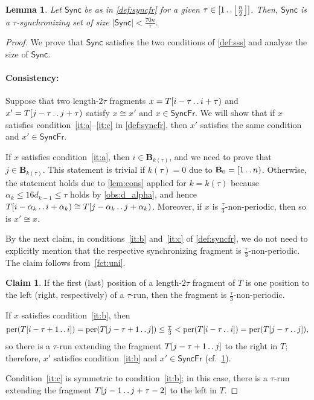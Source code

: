 \documentclass[a4paper]{article}
\newtheorem{lemma}[theorem]{Lemma}
\theoremstyle{definition}
\newtheorem{claim}[theorem]{Claim}
\theoremstyle{remark}
\newcommand{\B}{\mathbf{B}}
\newcommand{\floor}[1]{\left\lfloor #1 \right\rfloor}
\newcommand{\dd}{\mathinner{\ldotp\ldotp}}
\DeclareMathOperator{\per}{per}
\renewcommand{\S}{\mathsf{Sync}}
\renewcommand{\S}{\mathsf{Sync}}
\newcommand{\SF}{\mathsf{SyncFr}}
\begin{document}
\begin{lemma}\label{lem:sss}
Let $\S$ be as in \cref{def:syncfr} for a given $\tau\in [1\dd \floor{\frac{n}{2}}]$.
Then, $\S$ is a $\tau$-synchronizing set of size $|\S| < \tfrac{70n}{\tau}$.
\end{lemma}
\begin{proof}
We prove that $\S$ satisfies the two conditions of \cref{def:sss} and analyze the size of $\S$.

\paragraph*{\bf Consistency:}
Suppose that two length-$2\tau$ fragments $x=T[i-\tau \dd i+\tau)$ and $x'=T[j-\tau \dd j+\tau)$ satisfy $x \cong x'$ and $x \in \SF$.
We will show that if $x$ satisfies condition~\ref{it:a}--\ref{it:c} in \cref{def:syncfr}, then $x'$ satisfies the same condition and $x' \in \SF$.

If $x$ satisfies condition~\ref{it:a}, then $i\in \B_{k(\tau)}$, and we need to prove that $j\in \B_{k(\tau)}$. This statement is trivial if $k(\tau)=0$ due to $\B_0 = [1\dd n)$. Otherwise, the statement holds due to \cref{lem:cons} applied for $k=k(\tau)$ because $\alpha_k \le 16d_{k-1}\le \tau$ holds by \cref{obs:d_alpha}, and hence $T[i-\alpha_k\dd i+\alpha_k)\cong T[j-\alpha_k\dd j+\alpha_k)$. Moreover, if $x$ is $\frac{\tau}{3}$-non-periodic, then so is $x' \cong x$.

By the next claim, in conditions~\ref{it:b} and~\ref{it:c} of \cref{def:syncfr}, we do not need to explicitly mention that the respective synchronizing fragment is $\frac{\tau}{3}$-non-periodic. The claim follows from~\cref{fct:uni}.

\begin{claim}\label{fct:bc}
If the first (last) position of a length-$2\tau$ fragment of $T$ is one position to the left (right, respectively) of a $\tau$-run, then the fragment is $\frac{\tau}{3}$-non-periodic.
\end{claim}

If $x$ satisfies condition~\ref{it:b}, then
\[\per(T[i-\tau+1 \dd i])=\per(T[j-\tau+1 \dd j])\le\tfrac{\tau}{3}<\per(T[i-\tau \dd i])=\per(T[j-\tau \dd j]),\]
so there is a $\tau$-run extending the fragment $T[j-\tau+1 \dd j]$ to the right in $T$; therefore, $x'$ satisfies condition~\ref{it:b} and $x' \in \SF$
(cf.~\cref{fct:bc}).

Condition~\ref{it:c} is symmetric to condition~\ref{it:b}; in this case, there is a $\tau$-run extending the fragment $T[j-1 \dd j+\tau-2]$ to the left in $T$.


\end{proof}
\end{document}
